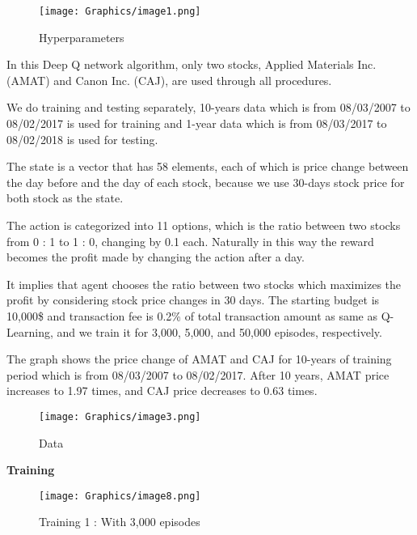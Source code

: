\begin{figure}[H]
\begin{center}
\texttt{[image: Graphics/image1.png]} \caption{Hyperparameters}
\end{center}
\end{figure}

In this Deep Q network algorithm, only two stocks, Applied Materials Inc. (AMAT) and Canon Inc. (CAJ), are used through all procedures.

We do training and testing separately, 10-years data which is from 08/03/2007 to 08/02/2017 is used for training and 1-year data which is from 08/03/2017 to 08/02/2018 is used for testing.  

The state is a vector that has 58 elements, each of which is price change between the day before and the day of each stock, because we use 30-days stock price for both stock as the state. 

The action is categorized into 11 options, which is the ratio between two stocks from 0 : 1 to 1 : 0, changing by 0.1 each. 
Naturally in this way the reward becomes the profit made by changing the action after a day.

It implies that agent chooses the ratio between two stocks which maximizes the profit by considering stock price changes in 30 days. 
The starting budget is 10,000\$ and transaction fee is 0.2\% of total transaction amount as same as Q-Learning, and we train it for 3,000, 5,000, and 50,000 episodes, respectively.

The graph shows the price change of AMAT and CAJ for 10-years of training period which is from 08/03/2007 to 08/02/2017.
After 10 years, AMAT price increases to 1.97 times, and CAJ price decreases to 0.63 times. 

\begin{figure}[H]
\begin{center}
\texttt{[image: Graphics/image3.png]} \caption{Data}
\end{center}
\end{figure}

\textbf{Training}

\begin{figure}[H]
\begin{center}
\texttt{[image: Graphics/image8.png]} \caption{Training 1 : With 3,000 episodes }
\end{center}
\end{figure}

